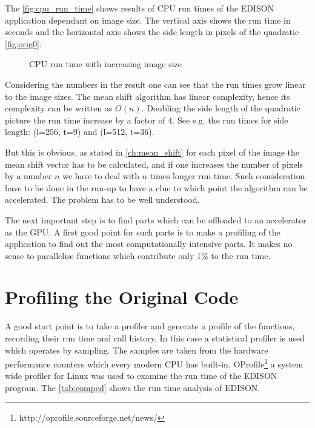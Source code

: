 The \autoref{fig:cpu_run_time} shows results of \gls{CPU} run times of
the \gls{EDISON} application dependant on image size. The vertical
axis shows the run time in seconds and the horizontal axis shows the
side length in pixels of the quadratic \autoref{fig:orig0}.
\begin{figure}[ht]
 \centering
 	\caption{\protect\Gls{CPU} run time with increasing image size}%
	\label{fig:cpu_run_time}%
\end{figure}
Considering the numbers in the result one can see that the run times
grow linear to the image sizes. The mean shift algorithm has linear
complexity, hence its complexity can be written as $O(n)$. Doubling
the side length of the quadratic picture the run time increase by a
factor of 4. See e.g.  the run times for side length: (l=256, t=9) and
(l=512, t=36).
    
But this is obvious, as stated in \autoref{ch:mean_shift} for each
pixel of the image the mean shift vector has to be calculated, and if
one increases the number of pixels by a number $n$ we have to deal
with $n$ times longer run time. Such consideration have to be done in
the run-up to have a clue to which point the algorithm can be
accelerated. The problem has to be well understood.

The next important step is to find parts which can be offloaded to an
accelerator as the \gls{GPU}. A first good point for such parts is to
make a profiling of the application to find out the most
computationally intensive parts. It makes no sense to parallelise
functions which contribute only 1\% to the run time.
    
\section{Profiling the Original Code} %
\label{sec:run_time_analysis_of_the_original_code}
A good start point is to take a profiler and generate a profile of the
functions, recording their run time and call history. In this case a
statistical profiler is used which operates by sampling. The samples
are taken from the hardware performance counters which every modern
\gls{CPU} has built-in.
OProfile\footnote{http://oprofile.sourceforge.net/news/} a system wide
profiler for Linux was used to examine the run time of the
\gls{EDISON} program. The \autoref{tab:comped} shows the run time
analysis of \gls{EDISON}.

